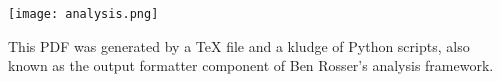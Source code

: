 \documentclass{article}
\begin{document}
{
	\small
	
}

\begin{center}
  \texttt{[image: analysis.png]}
\end{center}

This PDF was generated by a TeX file and a kludge of Python scripts, also known
as the output formatter component of Ben Rosser's analysis framework.

\clearpage
\end{document}
